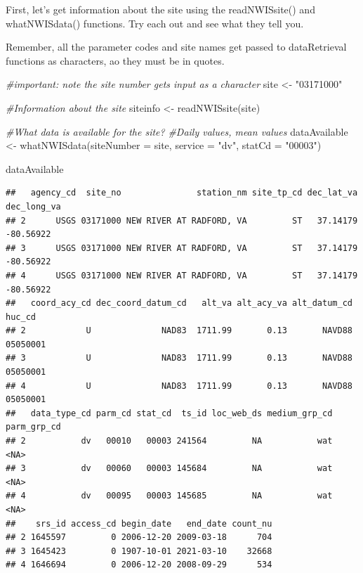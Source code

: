 \documentclass[
]{book}
\newenvironment{Shaded}{\begin{snugshade}}{\end{snugshade}}
\newcommand{\AttributeTok}[1]{\textcolor[rgb]{0.77,0.63,0.00}{#1}}
\newcommand{\CommentTok}[1]{\textcolor[rgb]{0.56,0.35,0.01}{\textit{#1}}}
\newcommand{\FunctionTok}[1]{\textcolor[rgb]{0.00,0.00,0.00}{#1}}
\newcommand{\NormalTok}[1]{#1}
\newcommand{\OtherTok}[1]{\textcolor[rgb]{0.56,0.35,0.01}{#1}}
\newcommand{\StringTok}[1]{\textcolor[rgb]{0.31,0.60,0.02}{#1}}
\begin{document}
First, let's get information about the site using the readNWISsite() and whatNWISdata() functions. Try each out and see what they tell you.

Remember, all the parameter codes and site names get passed to dataRetrieval functions as characters, ao they must be in quotes.

\begin{Shaded}
\begin{Highlighting}[]
\CommentTok{\#important: note the site number gets input as a character}
\NormalTok{site }\OtherTok{\textless{}{-}} \StringTok{"03171000"}

\CommentTok{\#Information about the site}
\NormalTok{siteinfo }\OtherTok{\textless{}{-}} \FunctionTok{readNWISsite}\NormalTok{(site)}

\CommentTok{\#What data is available for the site?}
\CommentTok{\#Daily values, mean values}
\NormalTok{dataAvailable }\OtherTok{\textless{}{-}} \FunctionTok{whatNWISdata}\NormalTok{(}\AttributeTok{siteNumber =}\NormalTok{ site, }\AttributeTok{service =} \StringTok{"dv"}\NormalTok{, }\AttributeTok{statCd =} \StringTok{"00003"}\NormalTok{)}

\NormalTok{dataAvailable}
\end{Highlighting}
\end{Shaded}

\begin{verbatim}
##   agency_cd  site_no               station_nm site_tp_cd dec_lat_va dec_long_va
## 2      USGS 03171000 NEW RIVER AT RADFORD, VA         ST   37.14179   -80.56922
## 3      USGS 03171000 NEW RIVER AT RADFORD, VA         ST   37.14179   -80.56922
## 4      USGS 03171000 NEW RIVER AT RADFORD, VA         ST   37.14179   -80.56922
##   coord_acy_cd dec_coord_datum_cd   alt_va alt_acy_va alt_datum_cd   huc_cd
## 2            U              NAD83  1711.99       0.13       NAVD88 05050001
## 3            U              NAD83  1711.99       0.13       NAVD88 05050001
## 4            U              NAD83  1711.99       0.13       NAVD88 05050001
##   data_type_cd parm_cd stat_cd  ts_id loc_web_ds medium_grp_cd parm_grp_cd
## 2           dv   00010   00003 241564         NA           wat        <NA>
## 3           dv   00060   00003 145684         NA           wat        <NA>
## 4           dv   00095   00003 145685         NA           wat        <NA>
##    srs_id access_cd begin_date   end_date count_nu
## 2 1645597         0 2006-12-20 2009-03-18      704
## 3 1645423         0 1907-10-01 2021-03-10    32668
## 4 1646694         0 2006-12-20 2008-09-29      534
\end{verbatim}
\end{document}
